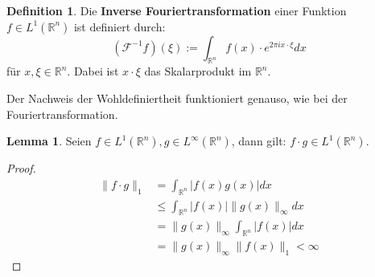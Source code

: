 \documentclass{article}
\newcommand{\R}[0]{\mathbb{R}}
\theoremstyle{plain}
\theoremstyle{definition}
\newtheorem{defin}[thm]{Definition}
\newtheorem{lemma}[thm]{Lemma}
\begin{document}
\begin{defin}
    Die \textbf{Inverse Fouriertransformation} einer Funktion $f \in L^1(\R^n)$ ist definiert durch:
    \begin{equation}
        (\mathcal{F}^{-1}f)(\xi) := \int_{\R^n} f(x) \cdot e^{2\pi i x \cdot \xi} dx
    \end{equation}
    für $x, \xi \in \R^n$. Dabei ist $x \cdot \xi$ das Skalarprodukt im $\R^n$.
\end{defin}
Der Nachweis der Wohldefiniertheit funktioniert genauso, wie bei der Fouriertransformation.

\begin{lemma}\label{lem:l1linfty}
    Seien $f\in L^1(\R^n), g \in L^{\infty}(\R^n)$, dann gilt: $f \cdot g \in L^1(\R^n)$.
\end{lemma}

\begin{proof}
    \begin{align*}
        \lVert f \cdot g \rVert_1 &= \int_{\R^n} |f(x)g(x)| dx \\
        &\leq \int_{\R^n} |f(x)| \lVert g(x) \rVert_{\infty} dx \\
        &= \lVert g(x) \rVert_{\infty} \int_{\R^n} |f(x)| dx \\
        &= \lVert g(x) \rVert_{\infty} \lVert f(x) \rVert_1 < \infty
    \end{align*}
\end{proof}
\end{document}
